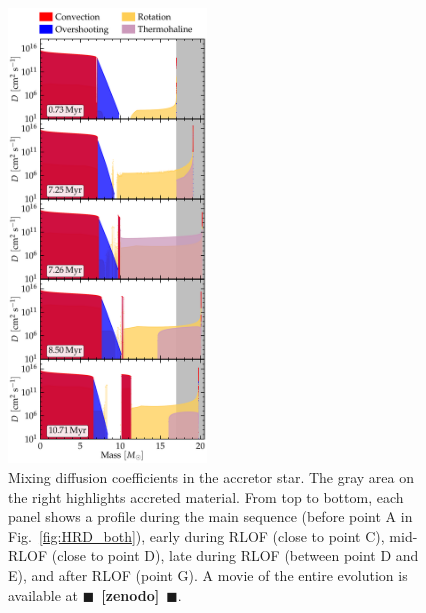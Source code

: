 \documentclass[twocolumn,twocolappendix,trackchanges]{aastex63}
\DeclareRobustCommand{\Figref}[1]{Fig.~\ref{#1}}
\newcommand{\todo}[1]{{\large $\blacksquare$~\textbf{\color{red}[#1]}}~$\blacksquare$}
\begin{document}
\begin{figure}[htbp]
  \includegraphics[width=0.47\textwidth]{D_mix_vertical}
  \caption{Mixing diffusion coefficients in the accretor star. The
    gray area on the right highlights accreted material. From
    top to bottom, each panel shows a profile during the main sequence
    (before point A in \Figref{fig:HRD_both}),
    early during RLOF (close to point C), mid-RLOF (close to
    point D), late during RLOF (between point D and E), and after RLOF
    (point G). A movie of the entire evolution is available at \todo{zenodo}.}
  \label{fig:D_mix}
\end{figure}
\end{document}
